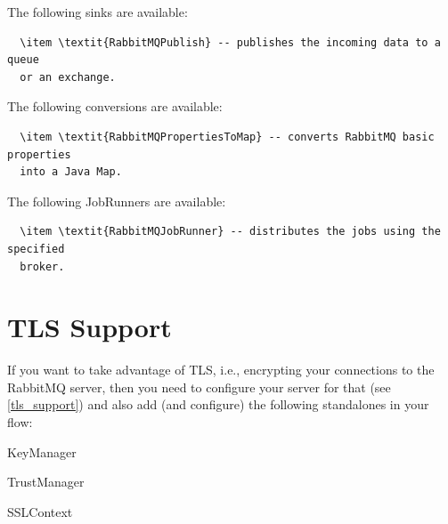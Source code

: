 \documentclass[a4paper]{book}
\begin{document}
The following sinks are available:
\begin{verbatim}
  \item \textit{RabbitMQPublish} -- publishes the incoming data to a queue
  or an exchange.
\end{verbatim}

The following conversions are available:
\begin{verbatim}
  \item \textit{RabbitMQPropertiesToMap} -- converts RabbitMQ basic properties
  into a Java Map.
\end{verbatim}

The following JobRunners are available:
\begin{verbatim}
  \item \textit{RabbitMQJobRunner} -- distributes the jobs using the specified
  broker.
\end{verbatim}

\section{TLS Support}
If you want to take advantage of TLS, i.e., encrypting your connections to
the RabbitMQ server, then you need to configure your server for that (see
\ref{tls_support}) and also add (and configure) the following standalones
in your flow:
\begin{tight_itemize}
  \item KeyManager
  \item TrustManager
  \item SSLContext
\end{tight_itemize}



\end{document}
